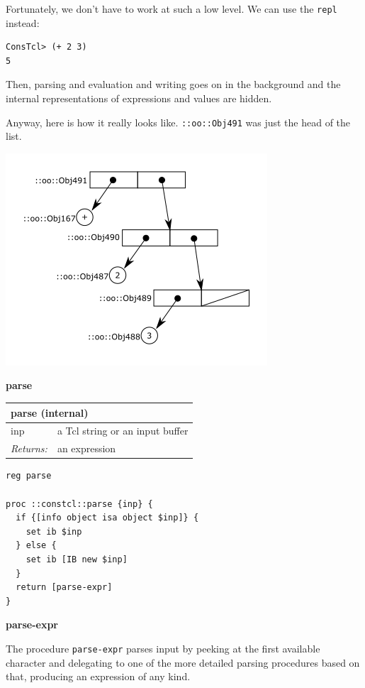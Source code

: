 \documentclass[twoside,9pt]{report}
\begin{document}
Fortunately, we don't have to work at such a low level. We can use the \texttt{repl} instead:

\noindent\makebox[\linewidth]{\rule{\linewidth}{0.4pt}}
\begin{lstlisting}
ConsTcl> (+ 2 3)
5
\end{lstlisting}
\noindent\makebox[\linewidth]{\rule{\linewidth}{0.4pt}}

Then, parsing and evaluation and writing goes on in the background and the internal representations of expressions and values are hidden.


Anyway, here is how it really looks like. \texttt{::oo::Obj491} was just the head of the list.


\includegraphics{images/intreplist.png}


\textbf{parse}

\begin{tabular}{ |l l| }
\hline
\multicolumn{2}{|l|}{parse (internal)} \\
\hline
inp & a Tcl string or an input buffer \\
\textit{Returns:} & an expression \\
\hline
\end{tabular}

\noindent\makebox[\linewidth]{\rule{\linewidth}{0.4pt}}
\begin{lstlisting}
reg parse
 
proc ::constcl::parse {inp} {
  if {[info object isa object $inp]} {
    set ib $inp
  } else {
    set ib [IB new $inp]
  }
  return [parse-expr]
}
\end{lstlisting}
\noindent\makebox[\linewidth]{\rule{\linewidth}{0.4pt}}

\textbf{parse-expr}


The procedure \texttt{parse-expr} parses input by peeking at the first available character and delegating to one of the more detailed parsing procedures based on that, producing an expression of any kind.
\end{document}
